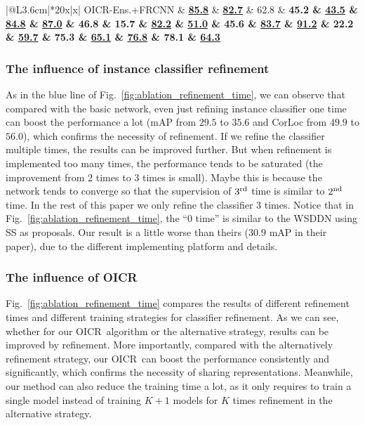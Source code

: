 \documentclass[10pt,twocolumn,letterpaper]{article}
\def\methodname{OICR}
\begin{document}
\begin{table*}[t]
\begin{center}
{\begin{tabular}{|@{}L{3.6cm}|*{20}{x}|x|}
   \methodname-Ens.+FRCNN & \underline{\bf{85.8}} & \underline{\bf{82.7}} & 62.8 & \bf{45.2} & \underline{\bf{43.5}} & \underline{\bf{84.8}} & \underline{\bf{87.0}} & 46.8 & 15.7 & \underline{\bf{82.2}} & \underline{\bf{51.0}} & 45.6 & \underline{\bf{83.7}} & \underline{\bf{91.2}} & 22.2 & \underline{\bf{59.7}} & 75.3 & \underline{\bf{65.1}} & \underline{\bf{76.8}} & \bf{78.1} & \underline{\bf{64.3}}\\
\hline
\end{tabular}
}
\end{center}
\caption{CorLoc (in $\%$) for different methods on VOC 2007 trainval set.
The upper part shows results using a single model.
The lower part shows results of combing multiple models.}
\label{table:voc_2007_corloc}
\end{table*}







\subsubsection{The influence of instance classifier refinement}
\label{sec:influence_lp}

As in the blue line of Fig.~\ref{fig:ablation_refinement_time}, we can observe that compared with the basic network, even just refining instance classifier one time can boost the performance a lot (mAP from $29.5$ to $35.6$ and CorLoc from $49.9$ to $56.0$), which confirms the necessity of refinement.
If we refine the classifier multiple times, the results can be improved further.
But when refinement is implemented too many times, the performance tends to be saturated (the improvement from 2 times to 3 times is small).
Maybe this is because the network tends to converge so that the supervision of $3^{\textup{rd}}$ time is similar to $2^{\textup{nd}}$ time.
In the rest of this paper we only refine the classifier $3$ times.
Notice that in Fig.~\ref{fig:ablation_refinement_time}, the ``0 time'' is similar to the WSDDN \cite{Ref:Bilen2016} using SS as proposals.
Our result is a little worse than theirs ($30.9$ mAP in their paper), due to the different implementing platform and details.


\subsubsection{The influence of OICR}
\label{sec:influence_oil}

Fig.~\ref{fig:ablation_refinement_time} compares the results of different refinement times and different training strategies for classifier refinement.
As we can see, whether for our \methodname\ algorithm or the alternative strategy, results can be improved by refinement.
More importantly, compared with the alternatively refinement strategy, our \methodname\ can boost the performance consistently and significantly, which confirms the necessity of sharing representations.
Meanwhile, our method can also reduce the training time a lot, as it only requires to train a single model instead of training $K+1$ models for $K$ times refinement in the alternative strategy.
\end{document}
